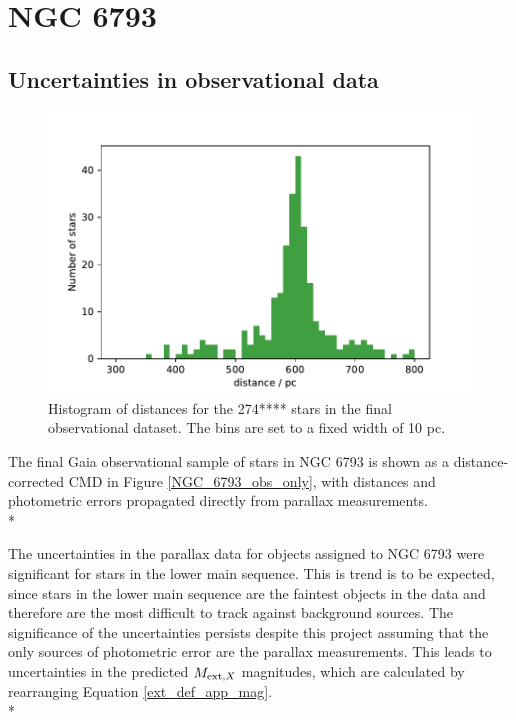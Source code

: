 \documentclass[12pt, a4paper]{report}
\begin{document}
\section{NGC 6793}
\subsection{Uncertainties in observational data}


\begin{figure}[h!]
\begin{center}
\includegraphics[width=1.0\textwidth]{../NGC_6793_distances_hist.pdf}
\caption{Histogram of distances for the 274**** stars in the final observational dataset. The bins are set to a fixed width of 10 pc.}
\label{NGC_6793_dist_hist}
\end{center}
\end{figure}

The final Gaia observational sample of stars in NGC 6793 is shown as a distance-corrected CMD in Figure \ref{NGC_6793_obs_only}, with distances and photometric errors propagated directly from parallax measurements.\\*

The uncertainties in the parallax data for objects assigned to NGC 6793 were significant for stars in the lower main sequence. This is trend is to be expected, since stars in the lower main sequence are the faintest objects in the data and therefore are the most difficult to track against background sources. The significance of the uncertainties persists despite this project assuming that the only sources of photometric error are the parallax measurements. This leads to uncertainties in the predicted $M_{\textnormal{ext},X}$ magnitudes, which are calculated by rearranging Equation \ref{ext_def_app_mag}.\\*
\end{document}
